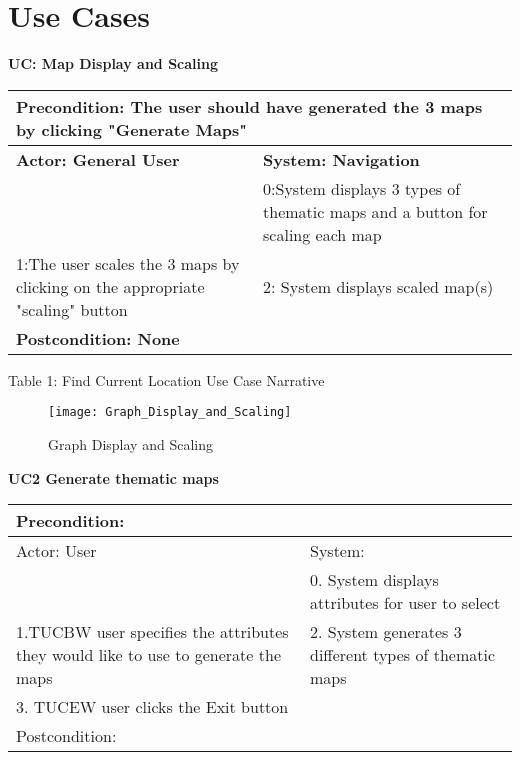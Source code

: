 \documentclass{article}
\begin{document}
	{
    \section{Use Cases}
\noindent\textbf{UC: Map Display and Scaling}

\begin{flushleft}
\begin{tabular}{ |p{7cm}|p{7cm}| } 
   \hline
  \multicolumn{2}{|p{\textwidth}|}{\textbf{Precondition:} The user should have generated the 3 maps by clicking "Generate Maps"} \\
  \hline
\textbf {Actor: General User} & \textbf{System: Navigation}\\ 
\hline
 & 0:System displays 3 types of thematic maps and a button for scaling each map\\ 
\hline
 1:The user scales the 3 maps by clicking on the appropriate "scaling" button  & 2: System displays scaled map(s) \\
  \hline
  \multicolumn{2}{|p{\textwidth}|}{\textbf{Postcondition: None}} \\
   \hline

\end{tabular}

\end{flushleft}
\begin{center}
    	Table 1: Find Current Location Use Case Narrative
\end{center}

\begin{figure}[h!]
	\texttt{[image: Graph\_Display\_and\_Scaling]}
	\caption{Graph Display and Scaling}
\end{figure}

\pagebreak

\noindent\textbf{UC2 Generate thematic maps}
\begin{flushleft}
\begin{tabular}{ |p{}|p{}| }
  \hline
  \multicolumn{2}{|p{\textwidth}|}{Precondition:} \\
  \hline
  Actor: User & System:  \\
   \hline
   & 0. System displays attributes for user to select \\
  \hline
    1.TUCBW user specifies the attributes they would like to use to generate the maps & 2. System generates 3 different types of thematic maps \\
  \hline
  3. TUCEW user clicks the Exit button & \\
  \hline
  \multicolumn{2}{|p{\textwidth}|}{Postcondition:} \\
   \hline
\end{tabular}
\end{flushleft}

}
\end{document}
